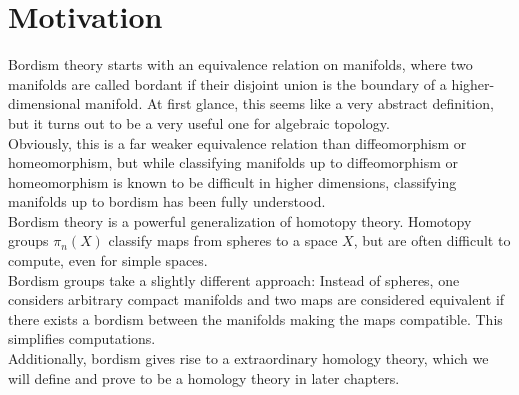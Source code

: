 \documentclass[a4paper,11pt]{article}
\begin{document}

\section{Motivation}\label{Motivation}
Bordism theory starts with an equivalence relation on manifolds, where two manifolds are called bordant if their disjoint union is the boundary of a higher-dimensional manifold. At first glance, this seems like a very abstract definition, but it turns out to be a very useful one for algebraic topology.\\
Obviously, this is a far weaker equivalence relation than diffeomorphism or homeomorphism, but while classifying manifolds up to diffeomorphism or homeomorphism is known to be difficult in higher dimensions, classifying manifolds up to bordism has been fully understood.\\
Bordism theory is a powerful generalization of homotopy theory. Homotopy groups \(\pi_n(X)\) classify maps from spheres to a space \(X\), but are often difficult to compute, even for simple spaces.\\
Bordism groups take a slightly different approach: Instead of spheres, one considers arbitrary compact manifolds and two maps are considered equivalent if there exists a bordism between the manifolds making the maps compatible. This simplifies computations.\\
Additionally, bordism gives rise to a extraordinary homology theory, which we will define and prove to be a homology theory in later chapters.

\end{document}

